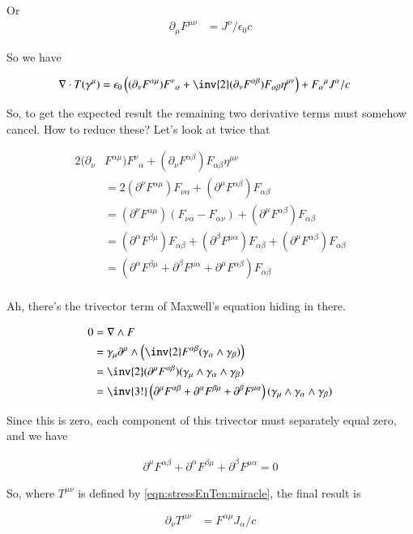 Or
\begin{align}
\partial_\mu F^{\mu\nu} &= J^\nu/\epsilon_0 c
\end{align}

So we have

\begin{align*}
\grad \cdot T(\gamma^\mu) 
&= \epsilon_0\left(
(\partial_\nu F^{\alpha\mu}) {F^{\nu}}_{\alpha} + 
\inv{2} (\partial_\nu F^{\alpha\beta}) F_{\alpha\beta} \eta^{\mu\nu} 
\right)
+
{F_{\alpha}}^{\mu} J^\alpha/c
\end{align*}

So, to get the expected result the remaining two derivative terms must somehow cancel.  How to reduce these?  Let's look at twice that

\begin{align*}
2 (\partial_\nu &F^{\alpha\mu}) {F^{\nu}}_{\alpha} + (\partial_\nu F^{\alpha\beta}) F_{\alpha\beta} \eta^{\mu\nu} \\
&= 2 (\partial^\nu F^{\alpha\mu}) F_{\nu\alpha} + (\partial^\mu F^{\alpha\beta}) F_{\alpha\beta} \\
&= (\partial^\nu F^{\alpha\mu}) (F_{\nu\alpha} -F_{\alpha\nu}) + (\partial^\mu F^{\alpha\beta}) F_{\alpha\beta} \\
&= 
(\partial^\alpha F^{\beta\mu}) F_{\alpha\beta} 
+(\partial^\beta F^{\mu\alpha}) F_{\alpha\beta}
+ (\partial^\mu F^{\alpha\beta}) F_{\alpha\beta} \\
&= 
(\partial^\alpha F^{\beta\mu} +\partial^\beta F^{\mu\alpha} + \partial^\mu F^{\alpha\beta}) F_{\alpha\beta} \\
\end{align*}

Ah, there's the trivector term of Maxwell's equation hiding in there.

\begin{align*}
0
&= \grad \wedge F \\
&= \gamma_\mu \partial^\mu \wedge \left(\inv{2} F^{\alpha\beta} (\gamma_\alpha \wedge \gamma_\beta) \right) \\
&= \inv{2} (\partial^\mu F^{\alpha\beta}) (\gamma_\mu \wedge \gamma_\alpha \wedge \gamma_\beta) \\
&= \inv{3!} 
\left(
\partial^\mu F^{\alpha\beta}
+\partial^\alpha F^{\beta\mu} 
+\partial^\beta F^{\mu\alpha}
\right)
(\gamma_\mu \wedge \gamma_\alpha \wedge \gamma_\beta)
\end{align*}

Since this is zero, each component of this trivector must separately equal zero, and we have

\begin{align}
\partial^\mu F^{\alpha\beta} +\partial^\alpha F^{\beta\mu} +\partial^\beta F^{\mu\alpha} = 0
\end{align}

So, where $T^{\mu\nu}$ is defined by \ref{eqn:stressEnTen:miracle}, the final result is

\begin{align}
\partial_\nu T^{\mu\nu} &= F^{\alpha\mu} J_\alpha/c
\end{align}
